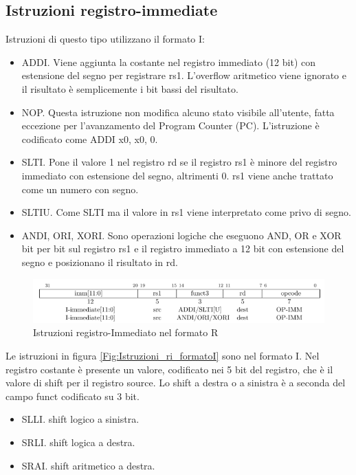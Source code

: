 \documentclass[12pt,a4paper]{report}
\begin{document}

\subsection{Istruzioni registro-immediate}
Istruzioni di questo tipo utilizzano il formato I:
\begin{itemize}
	\item ADDI.  Viene aggiunta la costante nel registro immediato (12 bit) con estensione del segno per registrare rs1. L'overflow aritmetico viene ignorato e il risultato è semplicemente i bit bassi del risultato.
 \item NOP. Questa istruzione non modifica alcuno stato visibile all'utente, fatta eccezione per l'avanzamento del Program Counter (PC). L'istruzione è codificato come ADDI x0, x0, 0.
 \item SLTI.  Pone il valore 1 nel registro rd se il registro rs1 è minore del registro immediato con estensione del segno, altrimenti 0. rs1 viene anche trattato come un numero con segno.
\item SLTIU.  Come SLTI ma il valore in rs1 viene interpretato come privo di segno.
\item ANDI, ORI, XORI. Sono operazioni logiche che eseguono AND, OR e XOR bit per bit sul registro rs1 e il registro immediato a 12 bit con estensione del segno e posizionano il risultato in rd.
\end{itemize}

\begin{figure}
	\includegraphics[width = \textwidth]{Istruzioni/Istruction1.png}
	\caption{Istruzioni registro-Immediato nel formato R}
	\label{Fig:Istruzioni_ri_formatoR}
\end{figure}


Le istruzioni in figura \ref{Fig:Istruzioni_ri_formatoI} sono nel formato I. Nel registro costante è presente un valore, codificato nei 5 bit del registro,  che è il valore di shift per il registro source. Lo shift a destra o a sinistra è a seconda del campo funct codificato su 3 bit.

\begin{itemize}
	\item  SLLI. shift logico a sinistra.
	\item SRLI. shift logica a destra.
	\item SRAI. shift aritmetico a destra.
\end{itemize}
\end{document}
